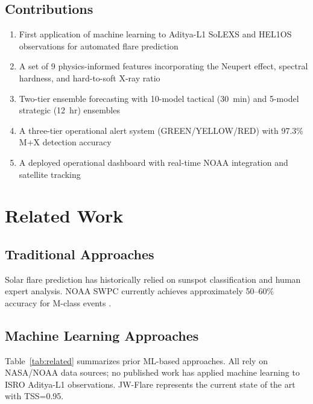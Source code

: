 \documentclass[twocolumn,10pt]{article}
\begin{document}
\subsection{Contributions}\label{sec:contributions}

\begin{enumerate}[nosep]
  \item First application of machine learning to Aditya-L1 SoLEXS and HEL1OS observations for automated flare prediction
  \item A set of 9 physics-informed features incorporating the Neupert effect, spectral hardness, and hard-to-soft X-ray ratio
  \item Two-tier ensemble forecasting with 10-model tactical (30~min) and 5-model strategic (12~hr) ensembles
  \item A three-tier operational alert system (GREEN/YELLOW/RED) with 97.3\% M+X detection accuracy
  \item A deployed operational dashboard with real-time NOAA integration and satellite tracking
\end{enumerate}


\section{Related Work}\label{sec:related}

\subsection{Traditional Approaches}

Solar flare prediction has historically relied on \citet{mcintosh1990} sunspot classification and human expert analysis. NOAA SWPC currently achieves approximately 50--60\% accuracy for M-class events \citep{crown2012}.

\subsection{Machine Learning Approaches}

Table~\ref{tab:related} summarizes prior ML-based approaches. All rely on NASA/NOAA data sources; no published work has applied machine learning to ISRO Aditya-L1 observations. JW-Flare \citep{ma2024} represents the current state of the art with TSS=0.95.
\end{document}
